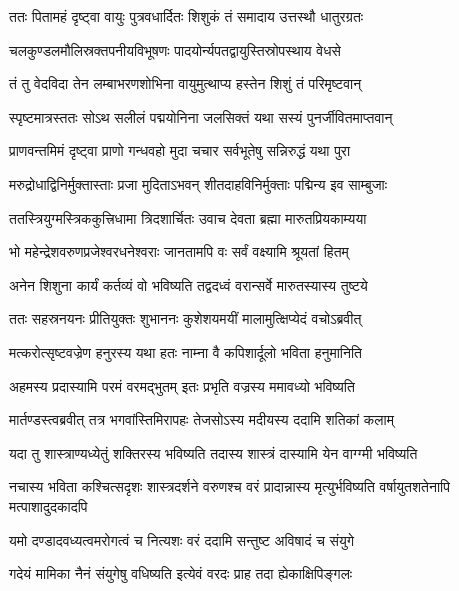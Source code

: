 
\twolineshloka
{ततः पितामहं दृष्ट्वा वायुः पुत्रवधार्दितः}
{शिशुकं तं समादाय उत्तस्थौ धातुरग्रतः} %

\twolineshloka
{चलकुण्डलमौलिस्रक्तपनीयविभूषणः}
{पादयोर्न्यपतद्वायुस्तिस्रोपस्थाय वेधसे} %

\twolineshloka
{तं तु वेदविदा तेन लम्बाभरणशोभिना}
{वायुमुत्थाप्य हस्तेन शिशुं तं परिमृष्टवान्} %

\twolineshloka
{स्पृष्टमात्रस्ततः सोऽथ सलीलं पद्मयोनिना}
{जलसिक्तं यथा सस्यं पुनर्जीवितमाप्तवान्} %

\twolineshloka
{प्राणवन्तमिमं दृष्ट्वा प्राणो गन्धवहो मुदा}
{चचार सर्वभूतेषु सन्निरुद्धं यथा पुरा} %

\twolineshloka
{मरुद्रोधाद्विनिर्मुक्तास्ताः प्रजा मुदिताऽभवन्}
{शीतदाहविनिर्मुक्ताः पद्मिन्य इव साम्बुजाः} %

\twolineshloka
{ततस्त्रियुग्मस्त्रिककुत्त्रिधामा त्रिदशार्चितः}
{उवाच देवता ब्रह्मा मारुतप्रियकाम्यया} %

\twolineshloka
{भो महेन्द्रेशवरुणप्रजेश्वरधनेश्वराः}
{जानतामपि वः सर्वं वक्ष्यामि श्रूयतां हितम्} %

\twolineshloka
{अनेन शिशुना कार्यं कर्तव्यं वो भविष्यति}
{तद्वदध्वं वरान्सर्वे मारुतस्यास्य तुष्टये} %

\twolineshloka
{ततः सहस्रनयनः प्रीतियुक्तः शुभाननः}
{कुशेशयमयीं मालामुत्क्षिप्येदं वचोऽब्रवीत्} %

\twolineshloka
{मत्करोत्सृष्टवज्रेण हनुरस्य यथा हतः}
{नाम्ना वै कपिशार्दूलो भविता हनुमानिति} %

\twolineshloka
{अहमस्य प्रदास्यामि परमं वरमद्भुतम्}
{इतः प्रभृति वज्रस्य ममावध्यो भविष्यति} %

\twolineshloka
{मार्तण्डस्त्वब्रवीत् तत्र भगवांस्तिमिरापहः}
{तेजसोऽस्य मदीयस्य ददामि शतिकां कलाम्} %

\twolineshloka
{यदा तु शास्त्राण्यध्येतुं शक्तिरस्य भविष्यति}
{तदास्य शास्त्रं दास्यामि येन वाग्ग्मी भविष्यति} %

\threelineshloka
{नचास्य भविता कश्चित्सदृशः शास्त्रदर्शने}
{वरुणश्च वरं प्रादान्नास्य मृत्युर्भविष्यति}
{वर्षायुतशतेनापि मत्पाशादुदकादपि} %

\twolineshloka
{यमो दण्डादवध्यत्वमरोगत्वं च नित्यशः}
{वरं ददामि सन्तुष्ट अविषादं च संयुगे} %

\twolineshloka
{गदेयं मामिका नैनं संयुगेषु वधिष्यति}
{इत्येवं वरदः प्राह तदा ह्येकाक्षिपिङ्गलः} %

